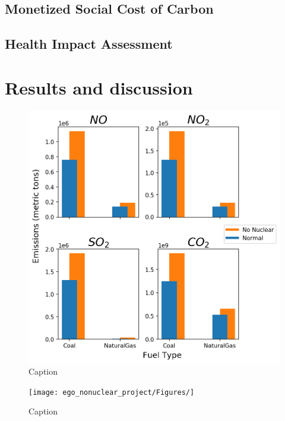 \documentclass[journal=jacsat,manuscript=article]{achemso}
\begin{document}
\subsection{Monetized Social Cost of Carbon}

\subsection{Health Impact Assessment}

\section{Results and discussion}
\begin{figure}
    \centering
    \includegraphics{ego_nonuclear_project/Figures/emissions_fueltype.png}
    \caption{Caption}
    \label{fig:my_label}
\end{figure}
\begin{figure}
    \centering
    \texttt{[image: ego\_nonuclear\_project/Figures/]}
    \caption{Caption}
    \label{fig:my_label}
\end{figure}
\end{document}
